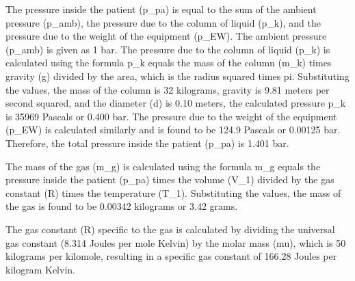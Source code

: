 The pressure inside the patient (p_pa) is equal to the sum of the ambient pressure (p_amb), the pressure due to the column of liquid (p_k), and the pressure due to the weight of the equipment (p_EW). The ambient pressure (p_amb) is given as 1 bar. The pressure due to the column of liquid (p_k) is calculated using the formula p_k equals the mass of the column (m_k) times gravity (g) divided by the area, which is the radius squared times pi. Substituting the values, the mass of the column is 32 kilograms, gravity is 9.81 meters per second squared, and the diameter (d) is 0.10 meters, the calculated pressure p_k is 35969 Pascals or 0.400 bar. The pressure due to the weight of the equipment (p_EW) is calculated similarly and is found to be 124.9 Pascals or 0.00125 bar. Therefore, the total pressure inside the patient (p_pa) is 1.401 bar. 

The mass of the gas (m_g) is calculated using the formula m_g equals the pressure inside the patient (p_pa) times the volume (V_1) divided by the gas constant (R) times the temperature (T_1). Substituting the values, the mass of the gas is found to be 0.00342 kilograms or 3.42 grams.

The gas constant (R) specific to the gas is calculated by dividing the universal gas constant (8.314 Joules per mole Kelvin) by the molar mass (mu), which is 50 kilograms per kilomole, resulting in a specific gas constant of 166.28 Joules per kilogram Kelvin.